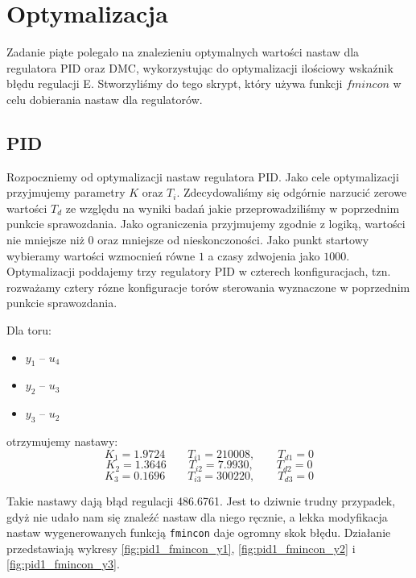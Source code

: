 \chapter{Optymalizacja}
Zadanie piąte polegało na znalezieniu optymalnych wartości nastaw dla regulatora PID oraz DMC, wykorzystując do optymalizacji ilościowy wskaźnik błędu regulacji E.
Stworzyliśmy do tego skrypt, który używa funkcji $fmincon$ w celu dobierania nastaw dla regulatorów.

\section{PID}
Rozpoczniemy od optymalizacji nastaw regulatora PID. Jako cele optymalizacji przyjmujemy parametry $K$ oraz $T_i$. Zdecydowaliśmy się odgórnie narzucić zerowe wartości
$T_d$ ze względu na wyniki badań jakie przeprowadziliśmy w poprzednim punkcie sprawozdania.
Jako ograniczenia przyjmujemy zgodnie z logiką, wartości nie mniejsze niż 0 oraz mniejsze od nieskonczoności.
Jako punkt startowy wybieramy wartości wzmocnień równe $1$ a  czasy zdwojenia jako $1000$.
Optymalizacji poddajemy trzy regulatory PID w czterech konfiguracjach, tzn.
rozważamy cztery rózne konfiguracje torów sterowania wyznaczone w poprzednim punkcie sprawozdania.

Dla toru:
\begin{itemize}
  \item $y_1$ -- $u_4$
 \item $y_2$ -- $u_3$
 \item $y_3$ -- $u_2$
\end{itemize}

otrzymujemy nastawy:
\begin{equation}
  K_1 = \num{1.9724} \qquad T_{i1} = \num{210008}, \qquad T_{d1} = 0 \nonumber
\end{equation}
\begin{equation}
  K_2 = \num{1.3646} \qquad T_{i2} = \num{7.9930}, \qquad T_{d2} = 0
\end{equation}
\begin{equation}
  K_3 = \num{0.1696} \qquad T_{i3} = \num{300220}, \qquad T_{d3} = 0 \nonumber
\end{equation}

Takie nastawy dają błąd regulacji \num{486,6761}. Jest to dziwnie trudny przypadek,
gdyż nie udało nam się znaleźć nastaw dla niego ręcznie, a lekka modyfikacja nastaw
wygenerowanych funkcją \texttt{fmincon} daje ogromny skok błędu. Działanie
przedstawiają wykresy \ref{fig:pid1_fmincon_y1}, \ref{fig:pid1_fmincon_y2} i \ref{fig:pid1_fmincon_y3}.

